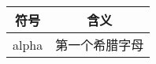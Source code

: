 \documentclass{article}
\begin{document}
\begin{tabular}{|c|c|}
\hline
符号 & 含义 \\
\hline
alpha & 第一个希腊字母 \\

\hline
\end{tabular}
\end{document}

